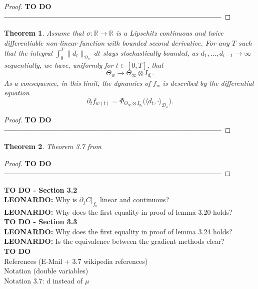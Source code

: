 \documentclass[11pt, a4paper]{article}
\newtheorem{theorem}{Theorem}[section]
\newcommand{\R}{\mathds{R}}
\newcommand{\D}{\mathcal{D}}
\begin{document}
\begin{proof}
\textbf{TO DO ---------------------------------------------------------------------------------}
\end{proof}

\begin{theorem}
Assume that $\sigma : \R \to \R$ is a Lipschitz continuous and twice differentiable non-linear function with bounded second derivative. For any $T$ such that the integral $\int_{0}^{T} \| d_t \|_{\D_x} \ dt$ stays stochastically bounded, as $d_1, \dots, d_{l-1} \to \infty$ sequentially, we have, uniformly for $t \in [0,T]$, that
\[ \Theta_w \to \Theta_{\infty} \otimes I_{d_l}. \]
As a consequence, in this limit, the dynamics of $f_w$ is described by the differential equation
\[ \partial_tf_{w(t)} = \Phi_{\Theta_{\infty} \otimes I_{d_l}} \Big ( \big \langle d_t, \cdot \big \rangle_{\D_x} \Big ). \]
\end{theorem}

\begin{proof}
\textbf{TO DO ---------------------------------------------------------------------------------}
\end{proof}

\begin{theorem} \label{thm:stieltjes}
Theorem 3.7 from \cite{Stieltjes}
\end{theorem}

\begin{proof}
\textbf{TO DO ---------------------------------------------------------------------------------}
\end{proof}

\pagebreak
\textbf{TO DO - Section 3.2} \\
\textbf{LEONARDO:} Why is $\partial_{f} C |_{f_0}$ linear and continuous? \\
\textbf{LEONARDO:} Why does the first equality in proof of lemma 3.20 holds? \\

\textbf{TO DO - Section 3.3} \\
\textbf{LEONARDO:} Why does the first equality in proof of lemma 3.24 holds? \\
\textbf{LEONARDO:} Is the equivalence between the gradient methods clear? \\

\textbf{TO DO} \\
References (E-Mail + 3.7 wikipedia references) \\
Notation (double variables) \\
Notation 3.7: d instead of $\mu$ \\
\end{document}
